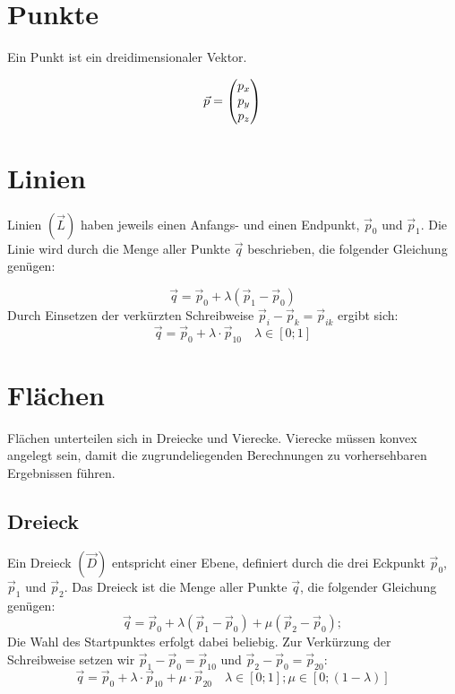 \section{Punkte}
Ein Punkt ist ein dreidimensionaler Vektor.

\begin{equation}
	\vec{p} = \begin{pmatrix}p_{x} \\ p_{y} \\ p_{z}\end{pmatrix}
\end{equation}

\section{Linien}
Linien $(\vec{L})$ haben jeweils einen Anfangs- und einen Endpunkt, $\vec{p}_{0}$ und $\vec {p}_{1}$. Die Linie wird durch die Menge aller Punkte $\vec{q}$ beschrieben, die folgender Gleichung genügen:

\begin{equation*}
	\vec{q} = \vec{p}_{0} + \lambda (\vec{p}_{1} - \vec{p}_{0})
\end{equation*}
Durch Einsetzen der verkürzten Schreibweise $\vec{p}_{i} - \vec{p}_{k} = \vec{p}_{ik}$ ergibt sich:
\begin{equation}
	\boxed{ \vec{q} = \vec{p}_{0} + \lambda \cdot \vec{p}_{10} } \quad \lambda \in [0; 1]
\end{equation}
\section{Flächen}
Flächen unterteilen sich in Dreiecke und Vierecke. Vierecke müssen konvex angelegt sein, damit die zugrundeliegenden Berechnungen zu vorhersehbaren Ergebnissen führen.

\subsection{Dreieck}Ein Dreieck $(\vec{D})$ entspricht einer Ebene, definiert durch die drei Eckpunkt $\vec{p}_{0}$, $\vec{p}_{1}$ und $\vec{p}_{2}$. Das Dreieck ist die Menge aller  Punkte $\vec{q}$, die folgender Gleichung genügen:
\begin{equation*}
	\vec{q}=\vec{p}_{0} + \lambda (\vec{p}_{1} - \vec{p}_{0}) + \mu (\vec{p}_{2} - \vec{p}_{0});
\end{equation*}
Die Wahl des Startpunktes erfolgt dabei beliebig. Zur Verkürzung der Schreibweise setzen wir $\vec{p}_{1} - \vec{p}_{0} = \vec{p}_{10}$ und $\vec{p}_{2} - \vec{p}_{0} = \vec{p}_{20}$:
\begin{equation}
	\label{GleichungDreieck}
	\boxed{ \vec{q}=\vec{p}_{0} + \lambda \cdot \vec{p}_{10} + \mu \cdot \vec{p}_{20} } \quad \lambda \in [0;1]; \mu \in [0;(1-\lambda)]
\end{equation}

